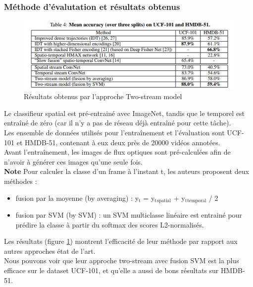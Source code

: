 \documentclass[11pt]{article}
\begin{document}
\subsubsection{Méthode d'évalutation et résultats obtenus}
\label{sec:org870ade7}
\begin{figure}[htbp]
\centering
\includegraphics[width=13cm]{two_stream_res.png}
\caption{Résultats obtenus par l'approche Two-stream model \label{two-stream-res}}
\end{figure}

Le classifieur spatial est pré-entrainé avec ImageNet, tandis que le temporel est entraîné de zéro (car il n'y a pas de réseau déjà entraîné pour cette tâche).\\
Les ensemble de données utilisés pour l'entraînement et l'évaluation sont UCF-101 et HMDB-51, contenant à eux deux près de 20000 vidéos annotées.\\
Avant l'entraînement, les images de flux optiques sont pré-calculées afin de n'avoir à générer ces images qu'une seule fois.\\

\textbf{Note} Pour calculer la classe d'un frame à l'instant t, les auteurs proposent deux méthodes :\\
\begin{itemize}
\item fusion par la moyenne (by averaging) : y\(_{\text{t}}\) = y\(_{\text{t}}\)\(_{\text{spatial}}\) + y\(_{\text{t}}\)\(_{\text{temporal}}\) / 2\\
\item fusion par SVM (by SVM) : un SVM multiclasse linéaire est entrainé pour prédire la classe à partir du softmax des scores L2-normalisés.\\
\end{itemize}

Les résultats (figure \ref{two-stream-res}) montrent l'efficacité de leur méthode par rapport aux autres approches état de l'art.\\

Nous pouvons voir que leur approche two-stream avec fusion SVM est la plus efficace sur le dataset UCF-101, et qu'elle a aussi de bons résultats sur HMDB-51.\\
\end{document}
